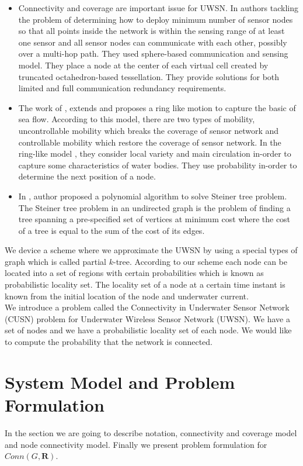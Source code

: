 \documentclass[12pt]{article}
\begin{document}
\begin{itemize}
\item Connectivity and coverage are important issue for UWSN. In \cite{Nazrul2008} authors tackling the problem of determining how to deploy minimum number of sensor nodes so that all points inside the network is within the sensing range of at least one sensor and all sensor nodes can communicate with each other, possibly over a multi-hop path. They used sphere-based communication
and sensing model. They place a node at the center of each virtual cell created by truncated octahedron-based
tessellation. They provide solutions for both
limited and full communication redundancy requirements.


\item The work of \cite{luo2009double}, \cite{luo2012double} extends \cite{caruso2008meandering} and proposes a ring like motion to capture the basic of sea flow. According to this model, there are two types of mobility, uncontrollable mobility which breaks the coverage of sensor network and controllable mobility which restore the coverage of sensor network. In the ring-like model \cite{luo2009double}, they consider local variety and main circulation in-order to capture some characteristics of water bodies. They use probability in-order to determine the next position of a node.

\item In \cite{wald1983steiner}, \cite{wald1983steiner1} author proposed a polynomial algorithm to solve Steiner tree problem. The Steiner tree problem  in an undirected graph is the problem of finding a tree spanning a pre-specified set of vertices at minimum cost where the cost of a tree is equal to the sum of the cost of its edges.
 \end{itemize}
We device a scheme where we approximate the UWSN by using a special types of graph which is called partial $k$-tree. According to our scheme each node can be located into a set of regions with certain probabilities which is known as probabilistic locality set. The locality set of a node at a certain time instant is known from the initial location of the node and underwater current.\\
 
We introduce a problem called the Connectivity in Underwater Sensor Network (CUSN) problem for Underwater Wireless Sensor Network (UWSN). We have a set of nodes and we have a probabilistic locality set of each node. We would like to compute the probability that the network is connected.
 

\section{System Model and Problem Formulation}
\label{sec:systemmodel}
In the section we are going to describe notation, connectivity and coverage model and node connectivity model. Finally we present problem formulation for $Conn(G,\textbf{R})$.
\end{document}
